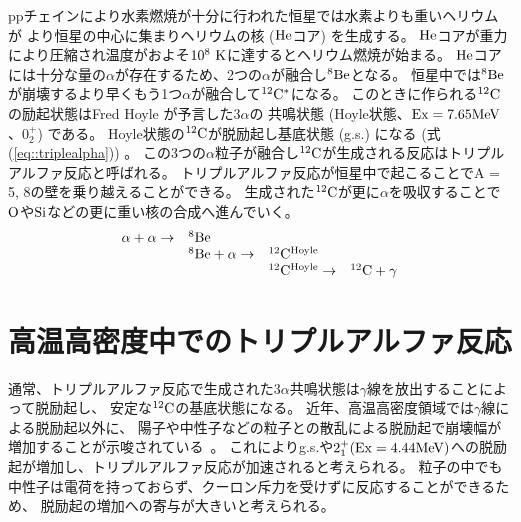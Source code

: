 ppチェインにより水素燃焼が十分に行われた恒星では水素よりも重いヘリウムが
より恒星の中心に集まりヘリウムの核 ($\rm{He}$コア) を生成する。
$\rm{He}$コアが重力により圧縮され温度がおよそ$10^8~\rm{K}$に達するとヘリウム燃焼が始まる。
$\rm{He}$コアには十分な量の$\alpha$が存在するため、2つの$\alpha$が融合し${}^{8}\rm{Be}$となる。
恒星中では${}^{8}\rm{Be}$が崩壊するより早くもう1つ$\alpha$が融合して${}^{12}\rm{C}^{*}$になる。
このときに作られる${}^{12}\rm{C}$の励起状態はFred Hoyle が予言した$3\alpha$の
共鳴状態 (Hoyle状態、$\rm{Ex} = 7.65\rm{MeV}$、$0_{2}^{+}$) である。
Hoyle状態の${}^{12}\rm{C}$が脱励起し基底状態 (g.s.) になる (式(\ref{eq::triplealpha})) 。
この3つの$\alpha$粒子が融合し${}^{12}\rm{C}$が生成される反応はトリプルアルファ反応と呼ばれる。
トリプルアルファ反応が恒星中で起こることでA = 5, 8の壁を乗り越えることができる。
生成された${}^{12}\rm{C}$が更に$\alpha$を吸収することで$\rm{O}$や$\rm{Si}$などの更に重い核の合成へ進んでいく。
\begin{equation}
  \begin{array}{llll}
    \alpha + \alpha \rightarrow & {}^{8}\rm{Be} & & \\
    & {}^{8}\rm{Be} + \alpha \rightarrow & {}^{12}\rm{C}^{Hoyle} &\\
    & & {}^{12}\rm{C}^{Hoyle} \rightarrow & {}^{12}\rm{C} + \gamma
  \end{array}\label{eq::triplealpha}
\end{equation}

\section{高温高密度中でのトリプルアルファ反応}
\label{seq::triplealphareaction}
通常、トリプルアルファ反応で生成された$3\alpha$共鳴状態は$\gamma$線を放出することによって脱励起し、
安定な${}^{12}\rm{C}$の基底状態になる。
近年、高温高密度領域では$\gamma$線による脱励起以外に、
陽子や中性子などの粒子との散乱による脱励起で崩壊幅が増加することが示唆されている~\cite{hotdensemedium}。
これによりg.s.や$2_{1}^{+} (\rm{Ex} = 4.44 \rm{MeV}) $への脱励起が増加し、トリプルアルファ反応が加速されると考えられる。
粒子の中でも中性子は電荷を持っておらず、クーロン斥力を受けずに反応することができるため、
脱励起の増加への寄与が大きいと考えられる。

